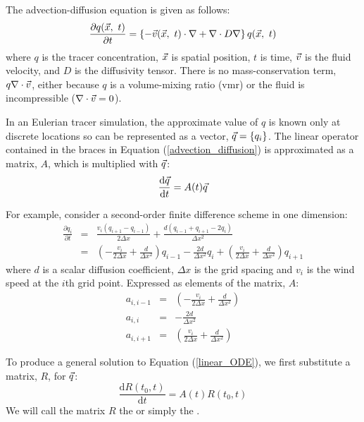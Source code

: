 The advection-diffusion equation is given as follows:
\begin{equation}
\frac{\partial q(\vec x, ~ t)}{\partial t} = \left \lbrace -\vec v(\vec x, ~t) \cdot \nabla + \nabla \cdot D \nabla \right \rbrace q(\vec x, ~ t)
\label{advection_diffusion}
\end{equation}
where $q$ is the tracer concentration, $\vec x$ is spatial position, 
$t$ is time, $\vec v$ is the fluid velocity, and $D$ is the diffusivity tensor.
There is no mass-conservation term, $q \nabla \cdot \vec v$,
either because $q$ is a volume-mixing ratio (vmr) or 
the fluid is incompressible ($\nabla \cdot \vec v = 0$).

In an Eulerian tracer simulation, the approximate value of $q$
is known only at discrete locations so can be represented as a vector,
$\vec q=\lbrace q_i \rbrace$.
The linear operator contained in the braces in Equation 
(\ref{advection_diffusion}) is approximated as a matrix, $A$, which is 
multiplied with $\vec q$:
\begin{equation}
\frac{\mathrm d \vec q}{\mathrm d t} = A(t) \vec q
\label{linear_ODE}
\end{equation}

For example, consider a second-order finite difference scheme in one dimension:
\begin{eqnarray}
\frac{\partial q_i}{\partial t} & = & \frac{v_i (q_{i+1} - q_{i-1})}{2 \Delta x} +
	\frac{d (q_{i-1} + q_{i+1} - 2 q_i)}{\Delta x^2} \\
& = & \left (- \frac{v_i}{2 \Delta x} + \frac{d}{\Delta x^2} \right ) q_{i-1} -
	\frac{2 d}{\Delta x^2} q_i + 
	\left (\frac{v_i}{2 \Delta x} + \frac{d}{\Delta x^2} \right ) q_{i+1} \label{finite_difference_diffusion}
\end{eqnarray}
where $d$ is a scalar diffusion coefficient, $\Delta x$ is the grid spacing
and $v_i$ is the wind speed at the $i$th grid point.
Expressed as elements of the matrix, $A$:
\begin{eqnarray}
a_{i,i-1} & = & \left (- \frac{v_i}{2 \Delta x} + \frac{d}{\Delta x^2} \right ) \\
	a_{i,i} & = & -\frac{2 d}{\Delta x^2} \\
a_{i,i+1} & = & \left (\frac{v_i}{2 \Delta x} + \frac{d}{\Delta x^2} \right )
\end{eqnarray}

To produce a general solution to Equation (\ref{linear_ODE}), 
we first substitute a matrix, $R$, for $\vec q$:
\begin{equation}
	\frac{\mathrm d R(t_0, t)}{\mathrm d t} = A(t) R(t_0, t)
\end{equation}
We will call the matrix $R$ the  or simply
the .

